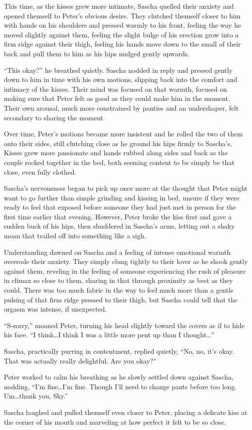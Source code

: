 This time, as the kisses grew more intimate, Sascha quelled their anxiety and opened themself to Peter's obvious desire. They clutched themself closer to him with hands on his shoulders and pressed warmly to his front, feeling the way he moved slightly against them, feeling the slight bulge of his erection grow into a firm ridge against their thigh, feeling his hands move down to the small of their back and pull them to him as his hips nudged gently upwards.

``This okay?'' he breathed quietly. Sascha nodded in reply and pressed gently down to him in time with his own motions, slipping back into the comfort and intimacy of the kisses. Their mind was focused on that warmth, focused on making sure that Peter felt as good as they could make him in the moment. Their own arousal, much more constrained by panties and an undershaper, felt secondary to sharing the moment.

Over time, Peter's motions became more insistent and he rolled the two of them onto their sides, still clutching close as he ground his hips firmly to Sascha's. Kisses grew more passionate and hands rubbed along sides and back as the couple rocked together in the bed, both seeming content to be simply be that close, even fully clothed.

Sascha's nervousness began to pick up once more at the thought that Peter might want to go further than simple grinding and kissing in bed, unsure if they were ready to feel that exposed before someone they had just met in person for the first time earlier that evening. However, Peter broke the kiss first and gave a sudden buck of his hips, then shuddered in Sascha's arms, letting out a shaky moan that trailed off into something like a sigh.

Understanding dawned on Sascha and a feeling of intense emotional warmth overrode their anxiety. They simply clung tightly to their lover as he shook gently against them, reveling in the feeling of someone experiencing the rush of pleasure in climax so close to them, sharing in that through proximity as best as they could. There was too much fabric in the way to feel much more than a gentle pulsing of that firm ridge pressed to their thigh, but Sascha could tell that the orgasm was intense, if unexpected.

``S-sorry,'' moaned Peter, turning his head slightly toward the covers as if to hide his face. ``I think\ldots{}I think I was a little more pent up than I thought\ldots{}''

Sascha, practically purring in contentment, replied quietly, ``No, no, it's okay. That was actually really delightful. Are you okay?''

Peter worked to calm his breathing as he slowly settled down against Sascha, nodding. ``I'm fine\ldots{}I'm fine. Though I'll need to change pants before too long. Um\ldots{}thank you, Sky.''

Sascha laughed and pulled themself even closer to Peter, placing a delicate kiss at the corner of his mouth and marveling at how perfect it felt to be so close.
